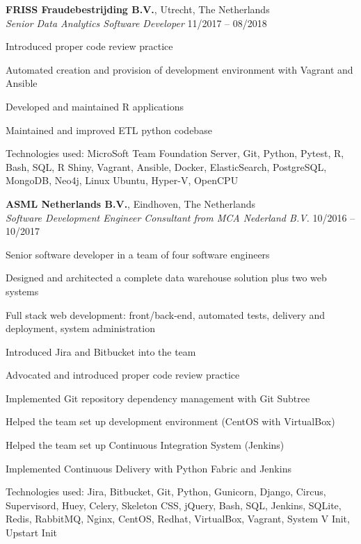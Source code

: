 \documentclass[margin,line]{resume}
\begin{document}
\begin{resume}
    \textbf{FRISS Fraudebestrijding B.V.}, Utrecht, The Netherlands \\
    \textsl{Senior Data Analytics Software Developer} \hfill 11/2017 -- 08/2018 \vspace{-3mm}\\\vspace{-1mm}%
      \begin{list2}
      \item Introduced proper code review practice
      \item Automated creation and provision of development environment with Vagrant and Ansible
      \item Developed and maintained R applications
      \item Maintained and improved ETL python codebase
      \item Technologies used: MicroSoft Team Foundation Server, Git, Python, Pytest, R, Bash, SQL, R Shiny, Vagrant, Ansible, Docker,
            ElasticSearch, PostgreSQL, MongoDB, Neo4j, Linux Ubuntu, Hyper-V, OpenCPU
      \end{list2}

    \textbf{ASML Netherlands B.V.}, Eindhoven, The Netherlands \\
    \textsl{Software Development Engineer Consultant from MCA Nederland B.V.} \hfill 10/2016 -- 10/2017 \vspace{-3mm}\\\vspace{-1mm}%
      \begin{list2}
      \item Senior software developer in a team of four software engineers
      \item Designed and architected a complete data warehouse solution plus two web systems
      \item Full stack web development: front/back-end, automated tests, delivery and deployment, \newline system administration
      \item Introduced Jira and Bitbucket into the team
      \item Advocated and introduced proper code review practice
      \item Implemented Git repository dependency management with Git Subtree
      \item Helped the team set up development environment (CentOS with VirtualBox)
      \item Helped the team set up Continuous Integration System (Jenkins)
      \item Implemented Continuous Delivery with Python Fabric and Jenkins
      \item Technologies used: Jira, Bitbucket, Git, Python, Gunicorn, Django, Circus, Supervisord, Huey, Celery, Skeleton CSS, jQuery,
            Bash, SQL, Jenkins, SQLite, Redis, RabbitMQ, Nginx, CentOS, Redhat, VirtualBox, Vagrant, System V Init, Upstart Init
      \end{list2}


\end{resume}
\end{document}
